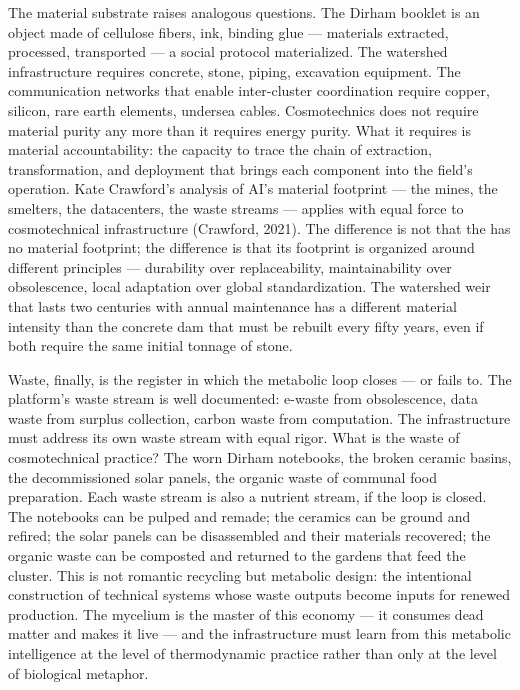 The material substrate raises analogous questions. The Dirham booklet is an object made of cellulose fibers, ink, binding glue — materials extracted, processed, transported — a social protocol materialized. The watershed infrastructure requires concrete, stone, piping, excavation equipment. The communication networks that enable inter-cluster coordination require copper, silicon, rare earth elements, undersea cables. Cosmotechnics does not require material purity any more than it requires energy purity. What it requires is material accountability: the capacity to trace the chain of extraction, transformation, and deployment that brings each component into the field's operation. Kate Crawford's analysis of AI's material footprint — the mines, the smelters, the datacenters, the waste streams — applies with equal force to cosmotechnical infrastructure (Crawford, 2021). The difference is not that the  has no material footprint; the difference is that its footprint is organized around different principles — durability over replaceability, maintainability over obsolescence, local adaptation over global standardization. The watershed weir that lasts two centuries with annual maintenance has a different material intensity than the concrete dam that must be rebuilt every fifty years, even if both require the same initial tonnage of stone.

Waste, finally, is the register in which the metabolic loop closes — or fails to. The platform's waste stream is well documented: e-waste from obsolescence, data waste from surplus collection, carbon waste from computation. The  infrastructure must address its own waste stream with equal rigor. What is the waste of cosmotechnical practice? The worn Dirham notebooks, the broken ceramic basins, the decommissioned solar panels, the organic waste of communal food preparation. Each waste stream is also a nutrient stream, if the loop is closed. The notebooks can be pulped and remade; the ceramics can be ground and refired; the solar panels can be disassembled and their materials recovered; the organic waste can be composted and returned to the gardens that feed the cluster. This is not romantic recycling but metabolic design: the intentional construction of technical systems whose waste outputs become inputs for renewed production. The mycelium is the master of this economy — it consumes dead matter and makes it live — and the  infrastructure must learn from this metabolic intelligence at the level of thermodynamic practice rather than only at the level of biological metaphor.

